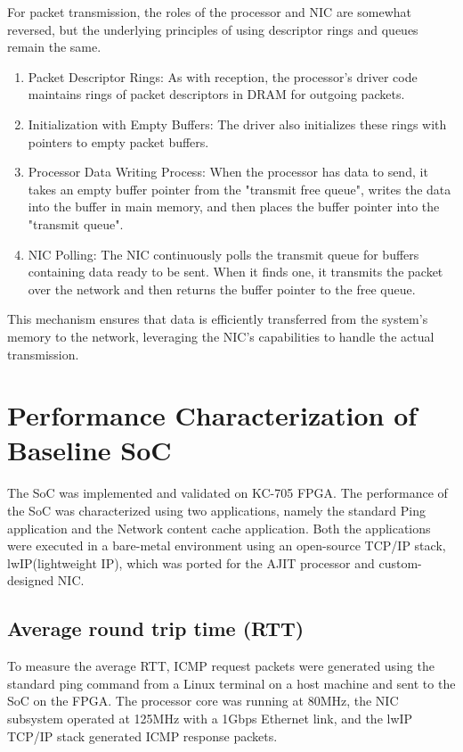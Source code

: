\documentclass[12pt]{report}
\begin{document}
For packet transmission, the roles of the processor and NIC are somewhat reversed, but the underlying principles of using descriptor rings and queues remain the same.
\begin{enumerate}
    \item Packet Descriptor Rings: As with reception, the processor's driver code maintains rings of packet descriptors in DRAM for outgoing packets.

    \item Initialization with Empty Buffers: The driver also initializes these rings with pointers to empty packet buffers.

    \item Processor Data Writing Process: When the processor has data to send, it takes an empty buffer pointer from the "transmit free queue", writes the data into the buffer in main memory, and then places the buffer pointer into the "transmit queue".

    \item NIC Polling: The NIC continuously polls the transmit queue for buffers containing data ready to be sent. When it finds one, it transmits the packet over the network and then returns the buffer pointer to the free queue.
\end{enumerate}


This mechanism ensures that data is efficiently transferred from the system's memory to the network, leveraging the NIC's capabilities to handle the actual transmission.

\section{Performance Characterization of Baseline SoC}
The SoC was implemented and validated on KC-705 FPGA.
The performance of the SoC was characterized using two applications, namely the standard Ping application and the Network content cache application. Both the applications were executed in a bare-metal environment using an open-source TCP/IP stack, lwIP(lightweight IP), which was ported for the AJIT processor and custom-designed NIC. 

\subsection{Average round trip time (RTT)}
To measure the average RTT, ICMP request packets were generated using the standard ping command from a Linux terminal on a host machine and sent to the SoC on the FPGA. The processor core was running at 80MHz, the NIC subsystem operated at 125MHz with a 1Gbps Ethernet link, and the lwIP TCP/IP stack generated ICMP response packets.
\end{document}
